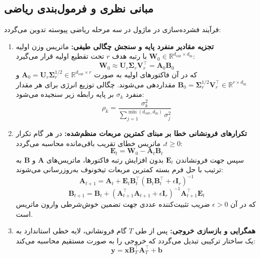 \subsection{مبانی نظری و فرمول‌بندی ریاضی}
فرآیند فشرده‌سازی در ماژول  در سه مرحله ریاضی پیوسته تدوین می‌گردد:

\begin{enumerate}
    \item \textbf{تجزیه مقادیر منفرد پایه و سنجش چگالی طیفی:}
    ماتریس وزن اولیه $\mathbf{W}_0 \in \mathbb{R}^{d_{\text{out}} \times d_{\text{in}}}$ با رتبه هدف $r$ تحت تقطیع اولیه قرار می‌گیرد:
    \begin{equation}
    \mathbf{W}_0 \approx \mathbf{U}_r \mathbf{\Sigma}_r \mathbf{V}_r^\top = \mathbf{A}_0 \mathbf{B}_0
    \end{equation}
    که در آن فاکتورهای اولیه به صورت $\mathbf{A}_0 = \mathbf{U}_r \mathbf{\Sigma}_r^{1/2} \in \mathbb{R}^{d_{\text{out}} \times r}$ و $\mathbf{B}_0 = \mathbf{\Sigma}_r^{1/2} \mathbf{V}_r^\top \in \mathbb{R}^{r \times d_{\text{in}}}$ مقداردهی می‌شوند. چگالی توزیع انرژی برای هر مقدار منفرد $\sigma_k$ بر پایه رابطه زیر سنجیده می‌شود:
    \begin{equation}
    \rho_k = \frac{\sigma_k^2}{\sum_{j=1}^{\min(d_{\text{out}}, d_{\text{in}})} \sigma_j^2}
    \end{equation}

    \item \textbf{تکرارهای فرونشانی خطا بر مبنای کمترین مربعات منظم‌شده:}
    در هر گام تکرار $t \ge 0$، ماتریس خطای تقریب باقی‌مانده محاسبه می‌گردد:
    \begin{equation}
    \mathbf{E}_t = \mathbf{W}_0 - \mathbf{A}_t \mathbf{B}_t
    \end{equation}
    سپس جهت فرونشاندن $\mathbf{E}_t$ بدون افزایش رتبه فاکتورها، ماتریس‌های $\mathbf{A}$ و $\mathbf{B}$ به ترتیب با حل فرم بسته کمترین مربعات تیخونوف به‌روزرسانی می‌شوند:
    \begin{equation}
    \mathbf{A}_{t+1} = \mathbf{A}_t + \mathbf{E}_t \mathbf{B}_t^\top \left(\mathbf{B}_t \mathbf{B}_t^\top + \epsilon \mathbf{I}_r\right)^{-1}
    \end{equation}
    \begin{equation}
    \mathbf{B}_{t+1} = \mathbf{B}_t + \left(\mathbf{A}_{t+1}^\top \mathbf{A}_{t+1} + \epsilon \mathbf{I}_r\right)^{-1} \mathbf{A}_{t+1}^\top \mathbf{E}_t
    \end{equation}
    که در آن $\epsilon > 0$ ضریب تثبیت‌کننده عددی جهت تضمین خوش‌شرطی وارون ماتریس است.

    \item \textbf{همگرایی و بازسازی خروجی:}
    پس از طی $T$ گام فرونشانی، لایه خطی استاندارد به یک ساختار ترکیبی  تبدیل می‌گردد که خروجی را به صورت مستقیم محاسبه می‌کند:
    \begin{equation}
    \mathbf{y} = \mathbf{x} \mathbf{B}_T^\top \mathbf{A}_T^\top + \mathbf{b}
    \end{equation}
\end{enumerate}

